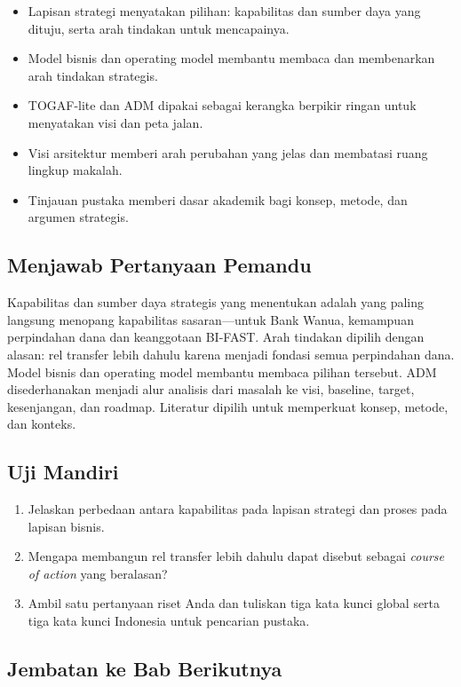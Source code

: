 \begin{itemize}
  \item Lapisan strategi menyatakan pilihan: kapabilitas dan sumber daya yang
        dituju, serta arah tindakan untuk mencapainya.
  \item Model bisnis dan operating model membantu membaca dan membenarkan arah
        tindakan strategis.
  \item TOGAF-lite dan ADM dipakai sebagai kerangka berpikir ringan untuk
        menyatakan visi dan peta jalan.
  \item Visi arsitektur memberi arah perubahan yang jelas dan membatasi ruang
        lingkup makalah.
  \item Tinjauan pustaka memberi dasar akademik bagi konsep, metode, dan
        argumen strategis.
\end{itemize}

\subsection*{Menjawab Pertanyaan Pemandu}

Kapabilitas dan sumber daya strategis yang menentukan adalah yang paling
langsung menopang kapabilitas sasaran---untuk Bank Wanua, kemampuan perpindahan
dana dan keanggotaan BI-FAST. Arah tindakan dipilih dengan alasan: rel transfer
lebih dahulu karena menjadi fondasi semua perpindahan dana. Model bisnis dan
operating model membantu membaca pilihan tersebut. ADM disederhanakan menjadi
alur analisis dari masalah ke visi, baseline, target, kesenjangan, dan roadmap.
Literatur dipilih untuk memperkuat konsep, metode, dan konteks.

\subsection*{Uji Mandiri}

\begin{enumerate}
  \item Jelaskan perbedaan antara kapabilitas pada lapisan strategi dan proses
        pada lapisan bisnis.
  \item Mengapa membangun rel transfer lebih dahulu dapat disebut sebagai
        \emph{course of action} yang beralasan?
  \item Ambil satu pertanyaan riset Anda dan tuliskan tiga kata kunci global
        serta tiga kata kunci Indonesia untuk pencarian pustaka.
\end{enumerate}

\subsection*{Jembatan ke Bab Berikutnya}


